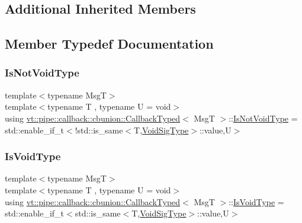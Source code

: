 \subsection*{Additional Inherited Members}


\subsection{Member Typedef Documentation}
\mbox{\label{structvt_1_1pipe_1_1callback_1_1cbunion_1_1_callback_typed_a57e15e61b171c50bff2e7a0dd9078f46}} 
\subsubsection{\texorpdfstring{Is\+Not\+Void\+Type}{IsNotVoidType}}
{\footnotesize\ttfamily template$<$typename MsgT$>$ \\
template$<$typename T , typename U  = void$>$ \\
using \hyperlink{structvt_1_1pipe_1_1callback_1_1cbunion_1_1_callback_typed}{vt\+::pipe\+::callback\+::cbunion\+::\+Callback\+Typed}$<$ MsgT $>$\+::\hyperlink{structvt_1_1pipe_1_1callback_1_1cbunion_1_1_callback_typed_a57e15e61b171c50bff2e7a0dd9078f46}{Is\+Not\+Void\+Type} =  std\+::enable\+\_\+if\+\_\+t$<$!std\+::is\+\_\+same$<$T,\hyperlink{structvt_1_1pipe_1_1callback_1_1cbunion_1_1_callback_typed_afeaa5f774eee46269e64e566b8239c22}{Void\+Sig\+Type}$>$\+::value,U$>$}

\mbox{\label{structvt_1_1pipe_1_1callback_1_1cbunion_1_1_callback_typed_aa23761e1f62f24201d28eed0e85322ac}} 
\subsubsection{\texorpdfstring{Is\+Void\+Type}{IsVoidType}}
{\footnotesize\ttfamily template$<$typename MsgT$>$ \\
template$<$typename T , typename U  = void$>$ \\
using \hyperlink{structvt_1_1pipe_1_1callback_1_1cbunion_1_1_callback_typed}{vt\+::pipe\+::callback\+::cbunion\+::\+Callback\+Typed}$<$ MsgT $>$\+::\hyperlink{structvt_1_1pipe_1_1callback_1_1cbunion_1_1_callback_typed_aa23761e1f62f24201d28eed0e85322ac}{Is\+Void\+Type} =  std\+::enable\+\_\+if\+\_\+t$<$std\+::is\+\_\+same$<$T,\hyperlink{structvt_1_1pipe_1_1callback_1_1cbunion_1_1_callback_typed_afeaa5f774eee46269e64e566b8239c22}{Void\+Sig\+Type}$>$\+::value,U$>$}

